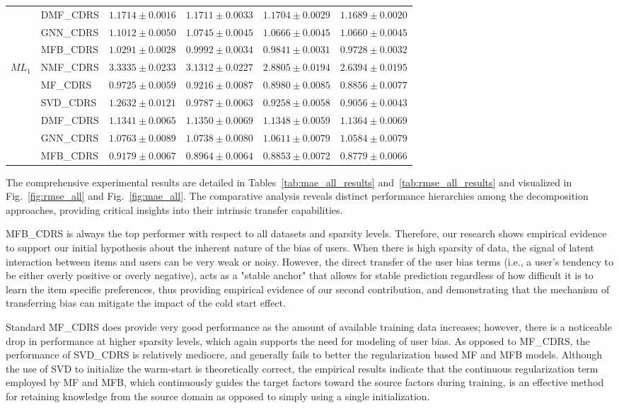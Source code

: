 \documentclass[pdflatex,sn-mathphys-num]{sn-jnl}%
\theoremstyle{thmstyleone}%
\theoremstyle{thmstyletwo}%
\theoremstyle{thmstylethree}%
\begin{document}
\begin{longtable}{llcccc}
 & DMF\_CDRS & $1.1714\pm0.0016$ & $1.1711\pm0.0033$ & $1.1704\pm0.0029$ & $1.1689\pm0.0020$ \\
 & GNN\_CDRS & $1.1012\pm0.0050$ & $1.0745\pm0.0045$ & $1.0666\pm0.0045$ & $1.0660\pm0.0045$ \\
 & MFB\_CDRS & $1.0291\pm0.0028$ & $0.9992\pm0.0034$ & $0.9841\pm0.0031$ & $0.9728\pm0.0032$ \\
\midrule
$ML_1$ & NMF\_CDRS & $3.3335\pm0.0233$ & $3.1312\pm0.0227$ & $2.8805\pm0.0194$ & $2.6394\pm0.0195$ \\
 & MF\_CDRS & $0.9725\pm0.0059$ & $0.9216\pm0.0087$ & $0.8980\pm0.0085$ & $0.8856\pm0.0077$ \\
 & SVD\_CDRS & $1.2632\pm0.0121$ & $0.9787\pm0.0063$ & $0.9258\pm0.0058$ & $0.9056\pm0.0043$ \\
 & DMF\_CDRS & $1.1341\pm0.0065$ & $1.1350\pm0.0069$ & $1.1348\pm0.0059$ & $1.1364\pm0.0069$ \\
 & GNN\_CDRS & $1.0763\pm0.0089$ & $1.0738\pm0.0080$ & $1.0611\pm0.0079$ & $1.0584\pm0.0079$ \\
 & MFB\_CDRS & $0.9179\pm0.0067$ & $0.8964\pm0.0064$ & $0.8853\pm0.0072$ & $0.8779\pm0.0066$ \\
\end{longtable}

The comprehensive experimental results are detailed in Tables~\ref{tab:mae_all_results} and~\ref{tab:rmse_all_results} and visualized in Fig.~\ref{fig:rmse_all} and Fig.~\ref{fig:mae_all}. The comparative analysis reveals distinct performance hierarchies among the decomposition approaches, providing critical insights into their intrinsic transfer capabilities.

MFB\_CDRS is always the top performer with respect to all datasets and sparsity levels. Therefore, our research shows empirical evidence to support our initial hypothesis about the inherent nature of the bias of users. When there is high sparsity of data, the signal of latent interaction between items and users can be very weak or noisy. However, the direct transfer of the user bias terms (i.e., a user's tendency to be either overly positive or overly negative), acts as a "stable anchor" that allows for stable prediction regardless of how difficult it is to learn the item specific preferences, thus providing empirical evidence of our second contribution, and demonstrating that the mechanism of transferring bias can mitigate the impact of the cold start effect.

Standard MF\_CDRS does provide very good performance as the amount of available training data increases; however, there is a noticeable drop in performance at higher sparsity levels, which again supports the need for modeling of user bias. As opposed to MF\_CDRS, the performance of SVD\_CDRS is relatively mediocre, and generally fails to better the regularization based MF and MFB models. Although the use of SVD to initialize the warm-start is theoretically correct, the empirical results indicate that the continuous regularization term employed by MF and MFB, which continuously guides the target factors toward the source factors during training, is an effective method for retaining knowledge from the source domain as opposed to simply using a single initialization.
\end{document}

